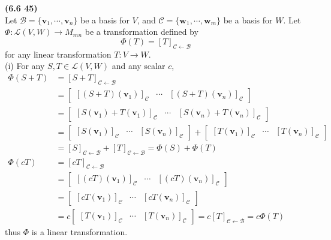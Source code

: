 \textbf{(6.6 45)} \\
Let $\mathcal{B} = \{\textbf{v}_1, \cdots, \textbf{v}_n\}$ be a basis for $V$, and $\mathcal{C} = \{\textbf{w}_1, \cdots, \textbf{w}_m\}$ be a basis for $W$. Let $\Phi: \mathscr{L}(V, W) \rightarrow M_{mn}$ be a transformation defined by \begin{equation*}
	\Phi(T) = [T]_{ \mathcal{C} \leftarrow \mathcal{B} }
\end{equation*} for any linear transformation $T: V \rightarrow W$. \\

(i) For any $S, T \in \mathscr{L}(V, W)$ and any scalar $c$, \begin{align*}
	\Phi(S + T) &= [S + T]_{ \mathcal{C} \leftarrow \mathcal{B} } \\
	&= \begin{bmatrix}
		\left[(S + T)(\textbf{v}_1)\right]_\mathcal{C} & \cdots & \left[(S + T)(\textbf{v}_n)\right]_\mathcal{C}
	\end{bmatrix} \\
	&= \begin{bmatrix}
	\left[S(\textbf{v}_1) + T(\textbf{v}_1)\right]_\mathcal{C} & \cdots & \left[S(\textbf{v}_n) + T(\textbf{v}_n)\right]_\mathcal{C}
	\end{bmatrix} \\
	&= \begin{bmatrix}
	\left[S(\textbf{v}_1)\right]_\mathcal{C} & \cdots & \left[S(\textbf{v}_n)\right]_\mathcal{C}
	\end{bmatrix} + \begin{bmatrix}
	\left[T(\textbf{v}_1)\right]_\mathcal{C} & \cdots & \left[T(\textbf{v}_n)\right]_\mathcal{C}
	\end{bmatrix} \\
	&= [S]_{ \mathcal{C} \leftarrow \mathcal{B} } +  [T]_{ \mathcal{C} \leftarrow \mathcal{B} } = \Phi(S) + \Phi(T) \\
	\Phi(cT) &= [cT]_{ \mathcal{C} \leftarrow \mathcal{B} } \\
	&= \begin{bmatrix}
	\left[(cT)(\textbf{v}_1)\right]_\mathcal{C} & \cdots & \left[(cT)(\textbf{v}_n)\right]_\mathcal{C}
	\end{bmatrix} \\
	&= \begin{bmatrix}
	\left[cT(\textbf{v}_1)\right]_\mathcal{C} & \cdots & \left[cT(\textbf{v}_n)\right]_\mathcal{C}
	\end{bmatrix} \\
	&= c\begin{bmatrix}
	\left[T(\textbf{v}_1)\right]_\mathcal{C} & \cdots & \left[T(\textbf{v}_n)\right]_\mathcal{C}
	\end{bmatrix} = c[T]_{ \mathcal{C} \leftarrow \mathcal{B} } = c\Phi(T)
\end{align*} thus $\Phi$ is a linear transformation. \\

